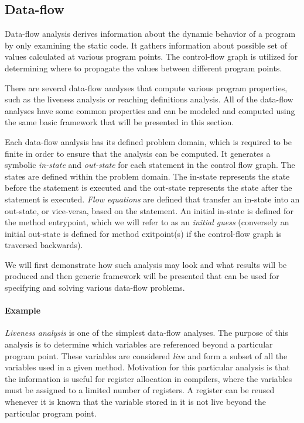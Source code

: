 \subsection{Data-flow}

Data-flow analysis derives information about the dynamic behavior of a program by only examining the static code. It gathers information about possible set of values calculated at various program points. The control-flow graph is utilized for determining where to propagate the values between different program points.

There are several data-flow analyses that compute various program properties, such as the liveness analysis or reaching definitions analysis. All of the data-flow analyses have some common properties and can be modeled and computed using the same basic framework that will be presented in this section.

Each data-flow analysis has its defined problem domain, which is required to be finite in order to ensure that the analysis can be computed. It generates a symbolic \emph{in-state} and \emph{out-state} for each statement in the control flow graph. The states are defined within the problem domain. The in-state represents the state before the statement is executed and the out-state represents the state after the statement is executed. \emph{Flow equations} are defined that transfer an in-state into an out-state, or vice-versa, based on the statement. An initial in-state is defined for the method entrypoint, which we will refer to as an \emph{initial guess} (conversely an initial out-state is defined for method exitpoint(s) if the control-flow graph is traversed backwards).

We will first demonstrate how such analysis may look and what results will be produced and then generic framework will be presented that can be used for specifying and solving various data-flow problems.

\paragraph{Example} \emph{Liveness analysis} is one of the simplest data-flow analyses. The purpose of this analysis is to determine which variables are referenced beyond a particular program point. These variables are considered \emph{live} and form a subset of all the variables used in a given method. Motivation for this particular analysis is that the information is useful for register allocation in compilers, where the variables must be assigned to a limited number of registers. A register can be reused whenever it is known that the variable stored in it is not live beyond the particular program point.

